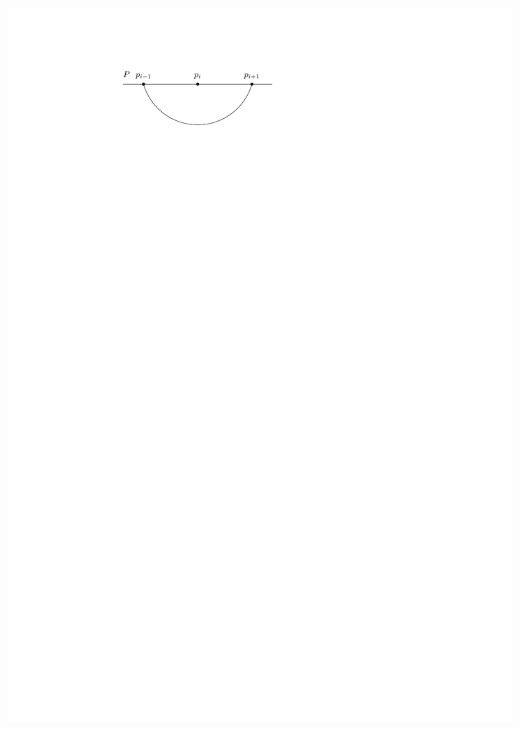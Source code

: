 \documentclass[a4paper]{article}
\begin{document}
\includegraphics[scale=1]{./unifiedAlgo/img/rightNeighbourwalk/pHasRightNeighbor.pdf}
\clearpage%
\end{document}
